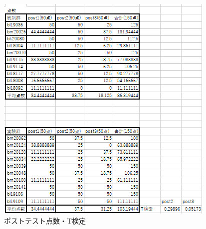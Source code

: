 \begin{figure}[tb]
	\includegraphics[width=0.9\linewidth]{tex2.png}
	\centering
	\caption{ポストテスト点数・T検定}
	\label{fig1}
\end{figure}